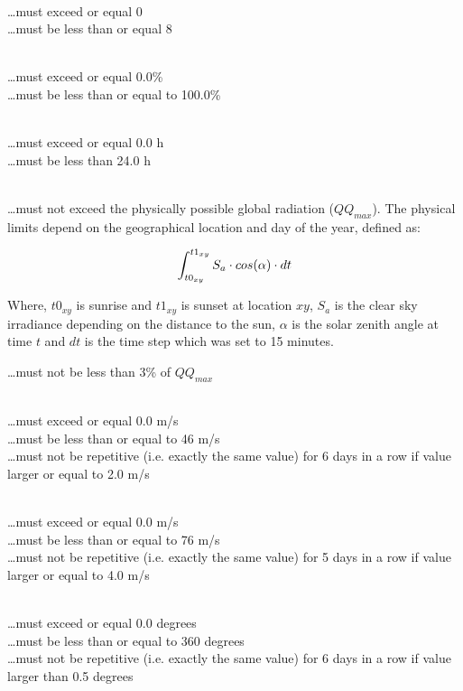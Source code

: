 \documentclass[a4paper,11pt]{article}
\begin{document}
\\
\ldots must exceed or equal 0\\
\ldots must be less than or equal 8
\medskip

\\
\ldots must exceed or equal 0.0\%\\
\ldots must be less than or equal to 100.0\%
\medskip

\\
\ldots must exceed or equal 0.0 h\\
\ldots must be less than 24.0 h
\medskip

\\
\ldots must not exceed the physically possible global radiation ($QQ_{max}$). The physical limits depend on the geographical location and day of the year, defined as:

\begin{equation}
     \int_{t0_{xy}}^{t1_{xy}}S_{a} \cdot cos(\alpha) \cdot dt \notag
\end{equation}

Where, $t0_{xy}$ is sunrise and $t1_{xy}$ is sunset at location $xy$, $S_{a}$ is the clear sky irradiance depending on the distance to the sun, $\alpha$ is the solar zenith angle at time $t$ and $dt$ is the time step which was set to 15 minutes. 

\ldots must not be less than 3\% of $QQ_{max}$
\medskip

\\
\ldots must exceed or equal 0.0 m/s\\
\ldots must be less than or equal to 46 m/s\\
\ldots must not be repetitive (i.e. exactly the same value) for 6
days in a row if value larger or equal to 2.0 m/s
\medskip

\\
\ldots must exceed or equal 0.0 m/s\\
\ldots must be less than or equal to 76 m/s\\
\ldots must not be repetitive (i.e. exactly the same value) for 5
days in a row if value larger or equal to 4.0 m/s
\medskip

\\
\ldots must exceed or equal 0.0 degrees\\
\ldots must be less than or equal to 360 degrees\\
\ldots must not be repetitive (i.e. exactly the same value) for 6 days
in a row if value larger than 0.5 degrees
\medskip
\end{document}
